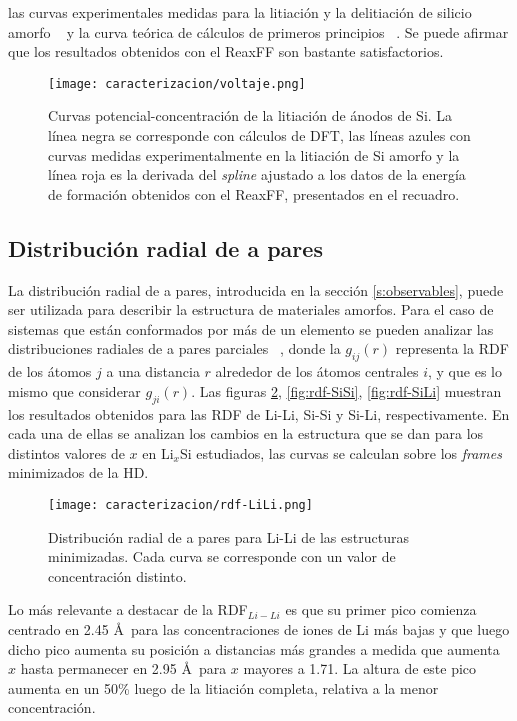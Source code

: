 las curvas experimentales medidas para la litiación y la delitiación de silicio
amorfo ~\cite{hatchard2004} y la curva teórica de cálculos de primeros principios 
~\cite{chevrier2009}. Se puede afirmar que los resultados obtenidos con el ReaxFF 
son bastante satisfactorios.
\begin{figure}[th]
    \centering
    \texttt{[image: caracterizacion/voltaje.png]}
    \caption{Curvas potencial-concentración de la litiación de ánodos de Si.
    La línea negra se corresponde con cálculos de DFT, las líneas azules con 
    curvas medidas experimentalmente en la litiación de Si amorfo y la línea 
    roja es la derivada del \textit{spline} ajustado a los datos de la energía 
    de formación obtenidos con el ReaxFF, presentados en el recuadro.}
    \label{fig:voltaje}
\end{figure}

\subsection{Distribución radial de a pares}

La distribución radial de a pares, introducida en la sección \ref{s:observables},
puede ser utilizada para describir la estructura de materiales amorfos. Para el 
caso de sistemas que están conformados por más de un elemento se pueden analizar 
las distribuciones radiales de a pares parciales ~\cite{lamparter1995}, donde la 
$g_{ij}(r)$ representa la RDF de los átomos $j$ a una distancia $r$ alrededor de 
los átomos centrales $i$, y que es lo mismo que considerar $g_{ji}(r)$. Las 
figuras \ref{fig:rdf-LiLi}, \ref{fig:rdf-SiSi}, \ref{fig:rdf-SiLi} muestran los
resultados obtenidos para las RDF de Li-Li, Si-Si y Si-Li, respectivamente. En
cada una de ellas se analizan los cambios en la estructura que se dan para los
distintos valores de $x$ en Li$_x$Si estudiados, las curvas se calculan sobre los
\textit{frames} minimizados de la HD.

\begin{figure}[h!]
    \centering
    \texttt{[image: caracterizacion/rdf-LiLi.png]}
    \caption{Distribución radial de a pares para Li-Li de las estructuras 
    minimizadas. Cada curva se corresponde con un valor de concentración 
    distinto.}
    \label{fig:rdf-LiLi}
\end{figure}
Lo más relevante a destacar de la RDF$_{Li-Li}$ es que su primer pico comienza 
centrado en 2.45 \AA\ para las concentraciones de iones de Li más bajas y que 
luego dicho pico aumenta su posición a distancias más grandes a medida que aumenta 
$x$ hasta permanecer en 2.95 \AA\ para $x$ mayores a 1.71. La altura de este pico
aumenta en un 50\% luego de la litiación completa, relativa a la menor 
concentración.

